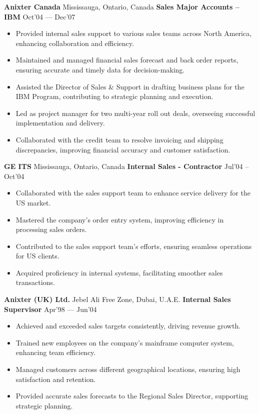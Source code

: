 \documentclass[11pt]{article}
\begin{document}
\vspace{6pt}
\textbf{Anixter Canada} \hfill Mississauga, Ontario, Canada
\textbf{Sales Major Accounts – IBM} \hfill Oct’04 — Dec’07
\begin{itemize}[noitemsep, topsep=0pt, partopsep=0pt, leftmargin=12pt]
    \item Provided internal sales support to various sales teams across North America, enhancing collaboration and efficiency.
    \item Maintained and managed financial sales forecast and back order reports, ensuring accurate and timely data for decision-making.
    \item Assisted the Director of Sales \& Support in drafting business plans for the IBM Program, contributing to strategic planning and execution.
    \item Led as project manager for two multi-year roll out deals, overseeing successful implementation and delivery.
    \item Collaborated with the credit team to resolve invoicing and shipping discrepancies, improving financial accuracy and customer satisfaction.
\end{itemize}
\vspace{6pt}
\textbf{GE ITS} \hfill Mississauga, Ontario, Canada
\textbf{Internal Sales - Contractor} \hfill Jul’04 – Oct’04
\begin{itemize}[noitemsep, topsep=0pt, partopsep=0pt, leftmargin=12pt]
    \item Collaborated with the sales support team to enhance service delivery for the US market.
    \item Mastered the company's order entry system, improving efficiency in processing sales orders.
    \item Contributed to the sales support team's efforts, ensuring seamless operations for US clients.
    \item Acquired proficiency in internal systems, facilitating smoother sales transactions.
\end{itemize}
\vspace{6pt}
\textbf{Anixter (UK) Ltd.} \hfill Jebel Ali Free Zone, Dubai, U.A.E.
\textbf{Internal Sales Supervisor} \hfill Apr’98 — Jun’04
\begin{itemize}[noitemsep, topsep=0pt, partopsep=0pt, leftmargin=12pt]
    \item Achieved and exceeded sales targets consistently, driving revenue growth.
    \item Trained new employees on the company’s mainframe computer system, enhancing team efficiency.
    \item Managed customers across different geographical locations, ensuring high satisfaction and retention.
    \item Provided accurate sales forecasts to the Regional Sales Director, supporting strategic planning.
\end{itemize}
\end{document}
